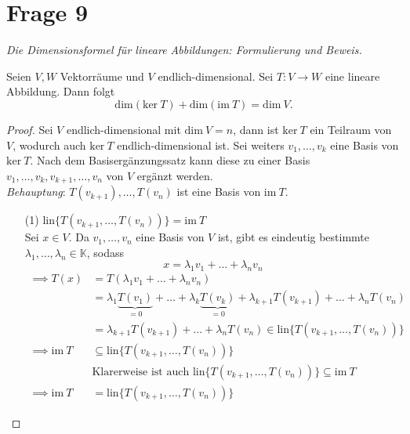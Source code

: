 \section{Frage 9}
\textit{Die Dimensionsformel für lineare Abbildungen: Formulierung und Beweis.}
\begin{theorem}
    Seien $V,W$ Vektorräume und $V$ endlich-dimensional. Sei $T:V\to W$
    eine lineare Abbildung. Dann folgt
    \[
        \mathrm{dim} (\mathrm{ker}\ T) + \mathrm{dim}(\mathrm{im}\ T) = \mathrm{dim}\ V
    .\]
\end{theorem}
\begin{proof}
    Sei $V$ endlich-dimensional mit $\mathrm{dim}\ V=n$, dann ist $\mathrm{ker}\ T$ ein 
    Teilraum von $V$, wodurch auch $\mathrm{ker}\ T$ endlich-dimensional ist. Sei
    weiters $v_1,\dots,v_k$ eine Basis von $\mathrm{ker}\ T$.
    Nach dem Basisergänzungssatz kann diese zu einer Basis $v_1,\dots,v_k,v_{k+1},\dots,v_n$
    von $V$ ergänzt werden.\\
    \textit{Behauptung}: $T(v_{k+1}),\dots,T(v_n)$ ist eine Basis von $\mathrm{im}\ T$.\\
    \begin{enumerate}
        \item[(1)] $\mathrm{lin}\{T(v_{k+1},\dots,T(v_{n}))\} = \mathrm{im}\ T$\\
        Sei $x\in V$. Da $v_1,\dots,v_n$ eine Basis von $V$ ist, gibt es 
        eindeutig bestimmte $\lambda_1,\dots,\lambda_n\in \mathbb{K}$, sodass
        \[
            x = \lambda_1v_1 + \dots + \lambda_n v_n    
        \]
        \begin{align*}
            \implies T(x) &= T(\lambda_1v_1 + \dots + \lambda_n v_n)\\
            &= \lambda_1 \underbrace{T(v_1)}_{=0} + \dots 
            + \lambda_k \underbrace{T(v_k)}_{=0} +
            \lambda_{k+1} T(v_{k+1}) + \dots +
            \lambda_n T(v_n)\\
            &=\lambda_{k+1} T(v_{k+1}) + \dots + \lambda_n T(v_n) 
            \in \mathrm{lin}\{T(v_{k+1},\dots,T(v_n))\}\\
            \implies \mathrm{im}\ T &\subseteq \mathrm{lin}\{
                T(v_{k+1},\dots,T(v_n))
            \}\\
            &\text{Klarerweise ist auch } \mathrm{lin}\{T(v_{k+1},\dots,T(v_n))\}\subseteq \mathrm{im}\ T\\
            \implies \mathrm{im}\ T &= \mathrm{lin}\{T(v_{k+1},\dots,T(v_n))\}

\end{align*}
\end{enumerate}
\end{proof}
